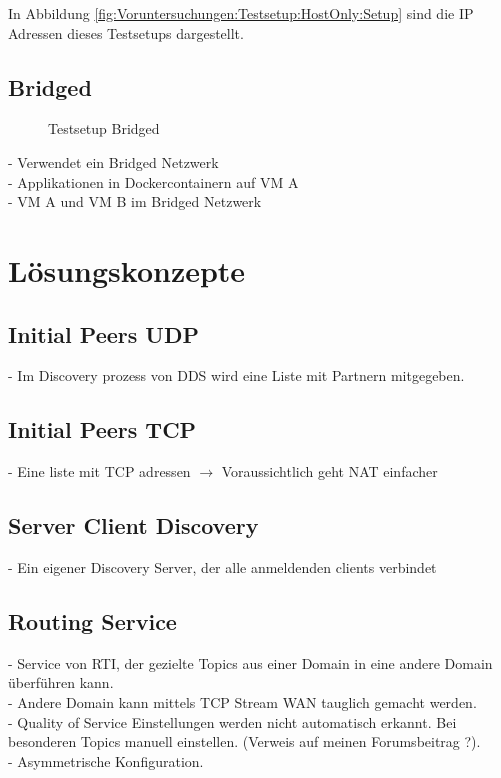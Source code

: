 			In Abbildung \ref{fig:Voruntersuchungen:Testsetup:HostOnly:Setup} sind die IP Adressen dieses Testsetups dargestellt.
					
		\subsection{Bridged}
		\label{Voruntersuchungen:Testsetup:Bridged}
		
			\begin{figure}[H]
				\centering
				
				\caption{Testsetup Bridged}
				\label{fig:Voruntersuchungen:Testsetup:Bridged:Setup}					
			\end{figure}
			- Verwendet ein Bridged Netzwerk\\
			- Applikationen in Dockercontainern auf VM A\\
			- VM A und VM B im Bridged Netzwerk\
		
	\section{Lösungskonzepte}
	\label{Voruntersuchungen:Lösungskonzepte}
		\subsection{Initial Peers UDP}
		\label{Voruntersuchungen:Lösungskonzepte:InitialPeersUDP}
			- Im Discovery prozess von DDS wird eine Liste mit Partnern mitgegeben.\\
		
		\subsection{Initial Peers TCP}
		\label{Voruntersuchungen:Lösungskonzepte:InitialPeersTPC}
		 	- Eine liste mit TCP adressen $\rightarrow$ Voraussichtlich geht NAT einfacher\\
		
		\subsection{Server Client Discovery}
		\label{Voruntersuchungen:Lösungskonzepte:ServerClientDiscovery}
			- Ein eigener Discovery Server, der alle anmeldenden clients verbindet\\
		
		\subsection{Routing Service}
		\label{Voruntersuchungen:Lösungskonzepte:RoutingService}
			- Service von RTI, der gezielte Topics aus einer Domain in eine andere Domain überführen kann.\\
			- Andere Domain kann mittels TCP Stream WAN tauglich gemacht werden.\\
			- Quality of Service Einstellungen werden nicht automatisch erkannt. Bei besonderen Topics manuell einstellen. (Verweis auf meinen Forumsbeitrag ?).\\
			- Asymmetrische Konfiguration.\\
		

